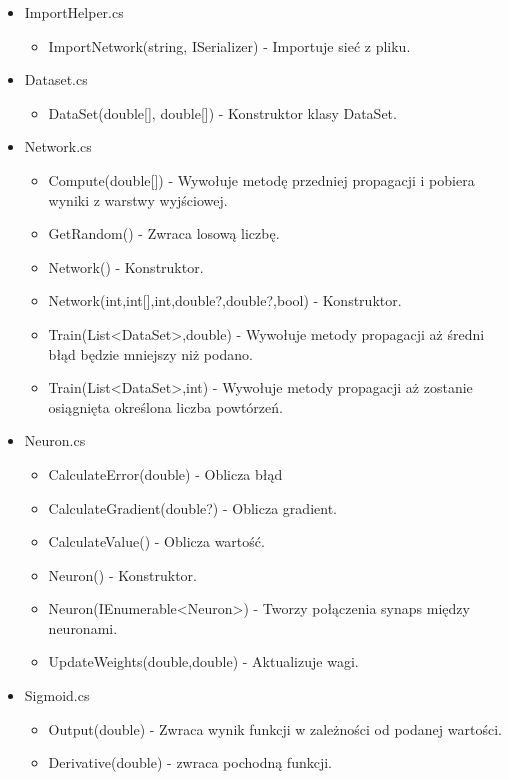 \documentclass[12pt,a4paper]{article}
\begin{document}
\begin{itemize}
\begin{itemize}
			\end{itemize}
		\item ImportHelper.cs
			\begin{itemize}
				\item ImportNetwork(string, ISerializer) - Importuje sieć z pliku.
			\end{itemize}
		\item Dataset.cs
			\begin{itemize}
				\item DataSet(double[], double[]) - Konstruktor klasy DataSet.
			\end{itemize}
		\item Network.cs
			\begin{itemize}
				\item Compute(double[]) - Wywołuje metodę przedniej propagacji i pobiera wyniki z warstwy wyjściowej.
				\item GetRandom() - Zwraca losową liczbę.
				\item Network() - Konstruktor.
				\item Network(int,int[],int,double?,double?,bool) - Konstruktor.
				\item Train(List<DataSet>,double) - Wywołuje metody propagacji aż średni błąd będzie mniejszy niż podano.
				\item Train(List<DataSet>,int) - Wywołuje metody propagacji aż zostanie osiągnięta określona liczba powtórzeń.
			\end{itemize}
		\item Neuron.cs
			\begin{itemize}
				\item CalculateError(double) - Oblicza błąd
				\item CalculateGradient(double?) - Oblicza gradient.
				\item CalculateValue() - Oblicza wartość.
				\item Neuron() - Konstruktor.
				\item Neuron(IEnumerable<Neuron>) - Tworzy połączenia synaps między neuronami.
				\item UpdateWeights(double,double) - Aktualizuje wagi.
			\end{itemize}
		\item Sigmoid.cs
			\begin{itemize}
				\item Output(double) - Zwraca wynik funkcji w zależności od podanej wartości.
				\item Derivative(double) - zwraca pochodną funkcji.

\end{itemize}
\end{itemize}
\end{document}
